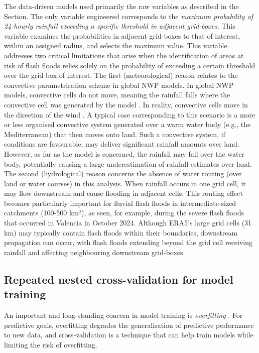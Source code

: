 \documentclass[nhess, manuscript]{copernicus}
\begin{document}
The data-driven models used primarily the raw variables as described in the Section. The only variable engineered corresponds to the \textit{maximum probability of 24-hourly rainfall exceeding a specific threshold in adjacent grid-boxes}. This variable examines the probabilities in adjacent grid-boxes to that of interest, within an assigned radius, and selects the maximum value. This variable addresses two critical limitations that arise when the identification of areas at risk of flash floods relies solely on the probability of exceeding a certain threshold over the grid box of interest. The first (meteorological) reason relates to the convective parametrisation scheme in global NWP models. In global NWP models, convective cells do not move, meaning the rainfall falls where the convective cell was generated by the model \citep{Doswell_2001}. In reality, convective cells move in the direction of the wind \citep{Doswell_2001}. A typical case corresponding to this scenario is a more or less organised convective system generated over a warm water body (e.g., the Mediterranean) that then moves onto land. Such a convective system, if conditions are favourable, may deliver significant rainfall amounts over land. However, as far as the model is concerned, the rainfall may fall over the water body, potentially causing a large underestimation of rainfall estimates over land. The second (hydrological) reason concerns the absence of water routing (over land or water courses) in this analysis. When rainfall occurs in one grid cell, it may flow downstream and cause flooding in adjacent cells. This routing effect becomes particularly important for fluvial flash floods in intermediate-sized catchments (100-500 km²), as seen, for example, during the severe flash floods that occurred in Valencia in October 2024. Although ERA5's large grid cells (31 km) may typically contain flash floods within their boundaries, downstream propagation can occur, with flash floods extending beyond the grid cell receiving rainfall and affecting neighbouring downstream grid-boxes.


\subsection{Repeated nested cross-validation for model training}

An important and long-standing concern in model training is \textit{overfitting} \citep{Ying_2019}. For predictive goals, overfitting degrades the generalisation of predictive performance to new data, and cross-validation is a technique that can help train models while limiting the risk of overfitting. 
\end{document}
